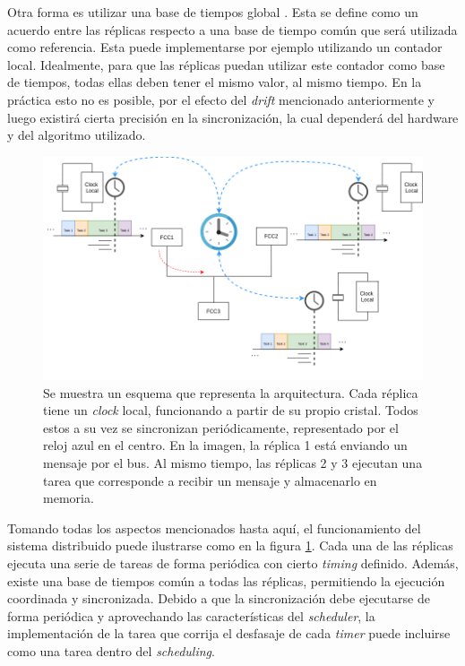 Otra forma es utilizar una base de tiempos global \cite[p.~51]{kopetz-2011}. Esta se define como un acuerdo entre las réplicas respecto a una base de tiempo común que será utilizada como referencia. Esta puede implementarse por ejemplo utilizando un contador local. Idealmente, para que las réplicas puedan utilizar este contador como base de tiempos, todas ellas deben tener el mismo valor, al mismo tiempo. En la práctica esto no es posible, por el efecto del \textit{drift} mencionado anteriormente y luego existirá cierta precisión en la sincronización, la cual dependerá del hardware y del algoritmo utilizado.

\begin{figure}[H]
    \centering
    \includegraphics[width=\textwidth]{img/diagrama_TTA.png}
    \caption{Se muestra un esquema que representa la arquitectura. Cada réplica tiene un \textit{clock} local, funcionando a partir de su propio cristal. Todos estos a su vez se sincronizan periódicamente, representado por el reloj azul en el centro. En la imagen, la réplica 1 está enviando un mensaje por el bus. Al mismo tiempo, las réplicas 2 y 3 ejecutan una tarea que corresponde a recibir un mensaje y almacenarlo en memoria.}
    \label{fig:diagrama_TTA}
\end{figure}

Tomando todas los aspectos mencionados hasta aquí, el funcionamiento del sistema distribuido puede ilustrarse como en la figura \ref{fig:diagrama_TTA}. Cada una de las réplicas ejecuta una serie de tareas de forma periódica con cierto \textit{timing} definido. Además, existe una base de tiempos común a todas las réplicas, permitiendo la ejecución coordinada y sincronizada. Debido a que la sincronización debe ejecutarse de forma periódica y aprovechando las características del \textit{scheduler}, la implementación de la tarea que corrija el desfasaje de cada \textit{timer} puede incluirse como una tarea dentro del \textit{scheduling}.

